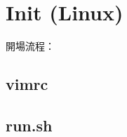 \documentclass[a4paper,10pt,twocolumn,oneside]{article}
\begin{document}
\newpage







\section{Init (Linux)}

開場流程：


\subsection{vimrc}


% 

\subsection{run.sh}

\end{document}
